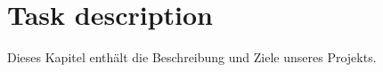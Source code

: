 \chapter{Task description}
\label{chap:Task description}

Dieses Kapitel enthält die Beschreibung und Ziele unseres Projekts.




